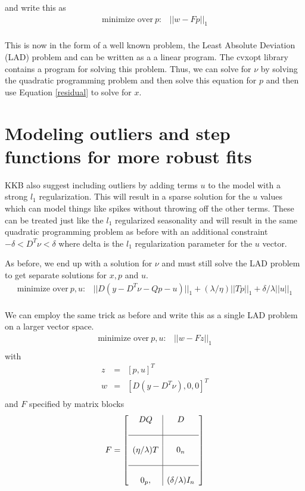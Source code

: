 \documentclass{article}
\begin{document}
and write this as
\begin{eqnarray}
\mbox{minimize over}~ p : & ||w-F p||_1 \\
\end{eqnarray}

This is now in the form of a well known problem, the Least Absolute Deviation (LAD) problem and can be written as a
a linear program. The cvxopt library contains a program for solving this problem. Thus,
we can solve for $\nu$ by solving the quadratic programming problem and then solve this equation for $p$ and then
use Equation \ref{residual} to solve for $x$.

\section{Modeling outliers and step functions for more robust fits}
KKB also suggest including outliers by adding terms $u$ to the model with a strong $l_1$ regularization. This will
result in a sparse solution for the $u$ values which can model things like spikes without throwing off the other terms.
These can be treated just like the $l_1$ regularized seasonality and will result in the same quadratic programming
problem as before with an additional constraint $-\delta < D^T \nu < \delta$ where delta is the $l_1$
regularization parameter for the $u$ vector.

As before, we end up with a solution for $\nu$ and must still solve the LAD problem to get separate solutions for
$x, p$ and $u$.
\begin{eqnarray}
\mbox{minimize over} ~p,u : & ||D (y - D^T \nu - Q p - u)||_1 + (\lambda / \eta) ||T p||_1 + \delta/\lambda ||u||_1 \\
\end{eqnarray}

We can employ the same trick as before and write this as a single LAD problem on a larger vector space.
\begin{eqnarray}
\mbox{minimize over}~ p,u : & ||w-F z||_1 \\
\end{eqnarray}
with
\begin{eqnarray}
z & = & [p , u]^T\\
w & = & [D (y - D^T \nu), 0, 0]^T \\
\end{eqnarray}
and $F$ specified by matrix blocks
\begin{equation}
F=\left[
\begin{array}{c|c}
D Q  & D   \\
\\
\hline
& \\
(\eta/\lambda) T & 0_n \\
\\
\hline
& \\
0_p, & (\delta/\lambda) I_n \\
\end{array}\right]
\end{equation}
\end{document}
